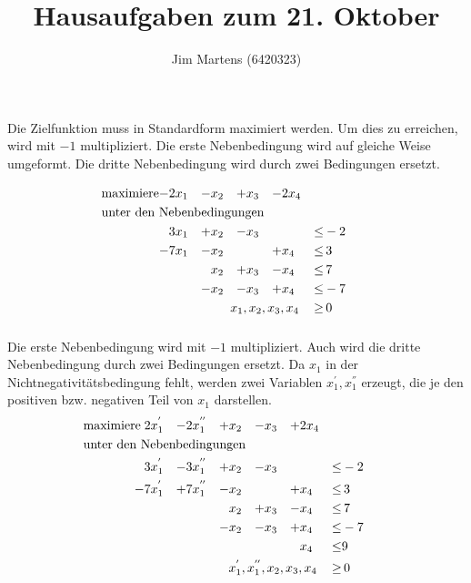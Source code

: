 \documentclass[10pt,a4paper,oneside,ngerman,numbers=noenddot]{scrartcl}
\begin{document}
\author{Jim Martens (6420323)}
\title{Hausaufgaben zum 21. Oktober}
\maketitle
\section{} %
	\subsection{} %
		\subsubsection{} %
		Die Zielfunktion muss in Standardform maximiert werden. Um dies zu erreichen, wird mit $-1$ multipliziert. Die erste Nebenbedingung wird auf gleiche Weise umgeformt. Die dritte Nebenbedingung wird durch zwei Bedingungen ersetzt.
		
		\begin{alignat*}{5}
		\text{maximiere} -& 2x_{1} &-& x_{2} &+& x_{3} &-& 2x_{4} && \\
		\multicolumn{10}{l}{\text{unter den Nebenbedingungen}} && \\
		& 3x_{1} &+& x_{2} &-& x_{3} && &\leq & -2 \\
		-& 7x_{1} &-& x_{2} && &+& x_{4} &\leq &\, 3 \\
		& && x_{2} &+& x_{3} &-& x_{4} &\leq &\, 7 \\
		& &-& x_{2} &-& x_{3} &+& x_{4} &\leq & -7 \\
		\multicolumn{8}{r}{$x_{1}, x_{2}, x_{3}, x_{4}$} \,&\geq &\, 0
		\end{alignat*}
		\subsubsection{} %
		Die erste Nebenbedingung wird mit $-1$ multipliziert. Auch wird die dritte Nebenbedingung durch zwei Bedingungen ersetzt. Da $x_{1}$ in der Nichtnegativitätsbedingung fehlt, werden zwei Variablen $x_{1}^{'}, x_{1}^{''}$ erzeugt, die je den positiven bzw. negativen Teil von $x_{1}$ darstellen.
		\begin{alignat*}{6}
		\text{maximiere}\; & 2x_{1}^{'} &-& 2x_{1}^{''} &+& x_{2} &-& x_{3} &+& 2x_{4} && \\
		\multicolumn{12}{l}{\text{unter den Nebenbedingungen}} && \\
		& 3x_{1}^{'} &-& 3x_{1}^{''} &+& x_{2} &-& x_{3} && &\leq & -2 \\
		-& 7x_{1}^{'} &+& 7x_{1}^{''} &-& x_{2} && &+& x_{4} &\leq &\, 3 \\
		& && && x_{2} &+& x_{3} &-& x_{4} &\leq &\, 7 \\
		& && &-& x_{2} &-& x_{3} &+& x_{4} &\leq & -7 \\
		& && && && && x_{4} &\leq & 9 \\
		\multicolumn{10}{r}{$x_{1}^{'}, x_{1}^{''}, x_{2}, x_{3}, x_{4}$} \,&\geq &\, 0
		\end{alignat*}
\end{document}
